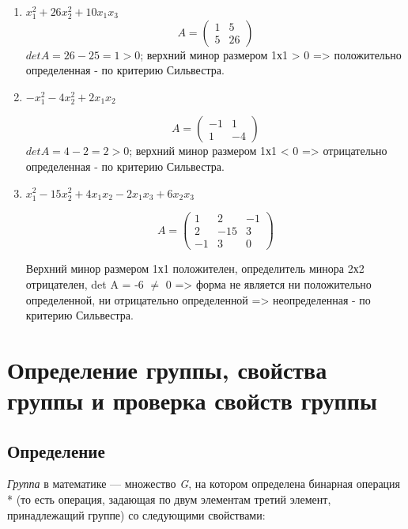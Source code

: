 \documentclass[12pt]{article}
\begin{document}
    \begin{enumerate}
        \item $x^2_{1} + 26x^2_{2} + 10x_{1}x_{3}$
              \[
                  A = \left(
                  \begin{array}{rrr}
                          1 & 5  \\
                          5 & 26
                      \end{array}
                  \right)
              \]
              $det A = 26 - 25 = 1 > 0$; верхний минор размером 1х1 > 0 => положительно определенная - по критерию Сильвестра.

        \item $-x^2_{1} - 4x^2_{2} + 2x_{1}x_{2}$

              \[
                  A = \left(
                  \begin{array}{rrr}
                          -1 & 1  \\
                          1  & -4
                      \end{array}
                  \right)
              \]
              $det A = 4 - 2 = 2 > 0$; верхний минор размером 1х1 < 0 => отрицательно определенная - по критерию Сильвестра.
        \item $x^2_{1} - 15x^2_{2} + 4x_{1}x_{2} - 2x_{1} x_{3} + 6x_{2} x_{3}$

              \[A = \left(
                  \begin{array}{rrr}
                          1  & 2   & -1 \\
                          2  & -15 & 3  \\
                          -1 & 3   & 0
                      \end{array}
                  \right)\]

              Верхний минор размером 1х1 положителен, определитель минора 2х2 отрицателен, det A = -6 $\neq$ 0 => форма не является ни положительно определенной, ни отрицательно определенной => неопределенная - по критерию Сильвестра.
    \end{enumerate}

    \section{Определение группы, свойства группы и проверка свойств группы}

    \subsection{Определение}
    \emph{Группа} в математике --- множество \emph{G}, на котором определена
    бинарная операция * (то есть операция, задающая по двум элементам третий
    элемент, принадлежащий группе) со следующими свойствами:
\end{document}

